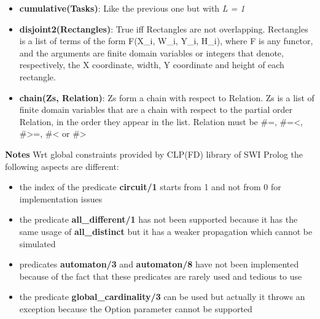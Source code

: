 \begin{itemize}
    \item \textbf{cumulative(Tasks)}: Like the previous one but with \textit{L = 1}
    \item \textbf{disjoint2(Rectangles)}: True iff Rectangles are not overlapping. Rectangles is a list of terms of the form F(X\_i, W\_i, Y\_i, H\_i), where F is any functor, and the arguments are finite domain variables or integers that denote, respectively, the X coordinate, width, Y coordinate and height of each rectangle.
    \item \textbf{chain(Zs, Relation)}: Zs form a chain with respect to Relation. Zs is a list of finite domain variables that are a chain with respect to the partial order Relation, in the order they appear in the list. Relation must be \#=, \#=<, \#>=, \#< or \#>
\end{itemize}
\textbf{Notes}\newline\newline
Wrt global constraints provided by CLP(FD) library of SWI Prolog the following aspects are different:
\begin{itemize}
    \item the index of the predicate \textbf{circuit/1} starts from 1 and not from 0 for implementation issues
    \item the predicate \textbf{all\_different/1} has not been supported because it has the same usage of \textbf{all\_distinct} but it has a weaker propagation which cannot be simulated
    \item predicates \textbf{automaton/3} and \textbf{automaton/8} have not been implemented because of the fact that these predicates are rarely used and tedious to use
    \item the predicate \textbf{global\_cardinality/3} can be used but actually it throws an exception because the Option parameter cannot be supported
\end{itemize}

